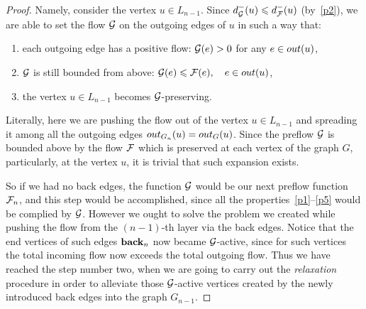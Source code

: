 \documentclass[12pt]{amsart}
\begin{document}
\begin{proof}
      Namely, consider the vertex $u \in L_{n-1}$.
      Since $d_{\cal{G}}^{-}(u) \leq d_{\flowpos}^{-}(u)$ (by~\ref{p2}),
        we are able to set the flow $\cal{G}$ on the outgoing edges of $u$ in such a way that:
      \begin{enumerate}[label=\textbf{(\roman*)}]
        \item\label{posprop} each outgoing edge has a positive flow: $\cal{G}(e) > 0$ for any $e \in \eout(u)$,
        \item $\cal{G}$ is still bounded from above:
          $\cal{G}(e) \leq \flowpos(e), \quad e \in \eout(u)$,
        \item the vertex $u \in L_{n-1}$ becomes $\cal{G}$-preserving.
      \end{enumerate}
      \begin{note}
        Literally, here we are pushing the flow out of the vertex $u \in L_{n-1}$ and spreading it among all the outgoing edges
          $\eout_{G_n}(u) = \eout_G(u)$.
        Since the preflow $\cal{G}$ is bounded above by the flow $\flowpos$ which is preserved at each vertex of the graph $G$,
          particularly, at the vertex $u$, it is trivial that such expansion exists.
      \end{note}
      So if we had no back edges, the function $\cal{G}$ would be our next preflow function $\flowposn{n}$, and this step would be accomplished,
        since all the properties~\ref{p1}--\ref{p5} would be complied by $\cal{G}$.
      However we ought to solve the problem we created while pushing the flow from the $(n-1)$-th layer via the back edges.
      Notice that the end vertices of such edges $\eback_{n}$ now became $\cal{G}$-active, since for such vertices
        the total incoming flow now exceeds the total outgoing flow. 
      Thus we have reached the step number two, when we are going to carry out the \emph{relaxation} procedure
        in order to alleviate those $\cal{G}$-active vertices created by the newly introduced back edges into the graph $G_{n-1}$.


\end{proof}
\end{document}
